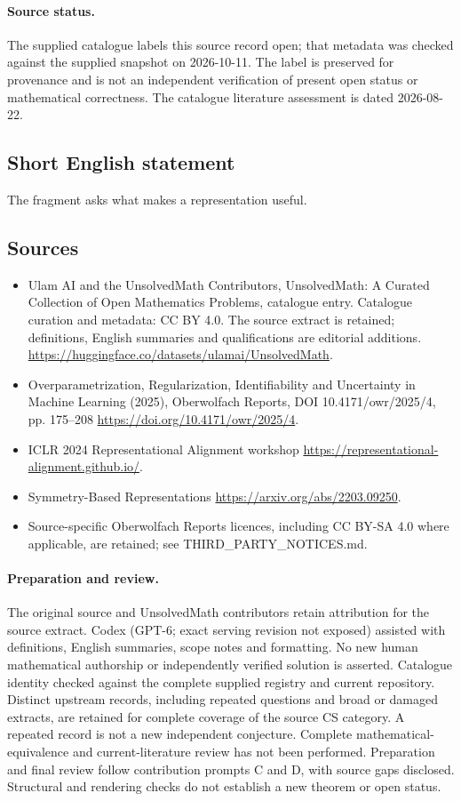 \documentclass[11pt]{article}
\begin{document}
\paragraph{Source status.}
The supplied catalogue labels this source record open; that metadata was checked against the supplied snapshot on 2026-10-11. The label is preserved for provenance and is not an independent verification of present open status or mathematical correctness. The catalogue literature assessment is dated 2026-08-22.
\subsection{Short English statement}
The fragment asks what makes a representation useful.
\subsection{Sources}
\begin{itemize}
\item[\hypertarget{source:statement:1}{S1}] Ulam AI and the UnsolvedMath Contributors, UnsolvedMath: A Curated Collection of Open Mathematics Problems, catalogue entry. Catalogue curation and metadata: CC BY 4.0. The source extract is retained; definitions, English summaries and qualifications are editorial additions.
\url{https://huggingface.co/datasets/ulamai/UnsolvedMath}.
\item[\hypertarget{source:statement:2}{S2}] Overparametrization, Regularization, Identifiability and Uncertainty in Machine Learning (2025), Oberwolfach Reports, DOI 10.4171/owr/2025/4, pp. 175--208
\url{https://doi.org/10.4171/owr/2025/4}.
\item[\hypertarget{source:statement:3}{S3}] ICLR 2024 Representational Alignment workshop
\url{https://representational-alignment.github.io/}.
\item[\hypertarget{source:statement:4}{S4}] Symmetry-Based Representations
\url{https://arxiv.org/abs/2203.09250}.
\item Source-specific Oberwolfach Reports licences, including CC BY-SA 4.0 where applicable, are retained; see THIRD\_PARTY\_NOTICES.md.
\end{itemize}
\paragraph{Preparation and review.}
The original source and UnsolvedMath contributors retain attribution for the source extract. Codex (GPT-6; exact serving revision not exposed) assisted with definitions, English summaries, scope notes and formatting. No new human mathematical authorship or independently verified solution is asserted. Catalogue identity checked against the complete supplied registry and current repository. Distinct upstream records, including repeated questions and broad or damaged extracts, are retained for complete coverage of the source CS category. A repeated record is not a new independent conjecture. Complete mathematical-equivalence and current-literature review has not been performed. Preparation and final review follow contribution prompts C and D, with source gaps disclosed. Structural and rendering checks do not establish a new theorem or open status.
\label{end:statement}
\end{document}
